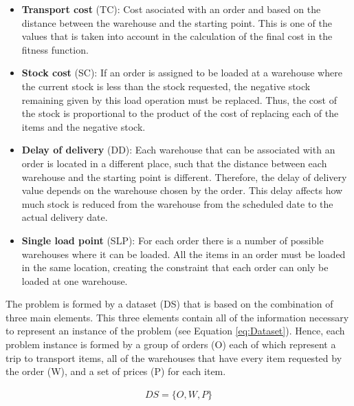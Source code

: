 \documentclass[letterpaper]{article} %
\begin{document}
\begin{itemize}
  \item \textbf{Transport cost }(TC): Cost asociated with an order and based on the distance between the warehouse and the starting point. This is one of the values that is taken into account in the calculation of the final cost in the fitness function.
  \item \textbf{Stock cost }(SC): If an order is assigned to be loaded at a warehouse where the current stock is less than the stock requested, the negative stock remaining given by this load operation must be replaced. Thus, the cost of the stock is proportional to the product of the cost of replacing each of the items and the negative stock.
  \item \textbf{Delay of delivery }(DD): Each warehouse that can be associated with an order is located in a different place, such that the distance between each warehouse and the starting point is different. Therefore, the delay of delivery value depends on the warehouse chosen by the order. This delay affects how much stock is reduced from the warehouse from the scheduled date to the actual delivery date.
  \item \textbf{Single load point }(SLP): For each order there is a number of possible warehouses where it can be loaded. All the items in an order must be loaded in the same location, creating the constraint that each order can only be loaded at one warehouse.
\end{itemize}

The problem is formed by a dataset (DS) that is based on the combination of three main elements. This three elements contain all of the information necessary to represent an instance of the problem (see Equation \ref{eq:Dataset}). Hence, each problem instance is formed by a group of orders (O) each of which represent a trip to transport items, all of the warehouses that have every item requested by the order (W), and a set of prices (P) for each item. 

\begin{equation}\label{eq:Dataset}
    \begin{aligned}
        DS = \{O, W, P\} \\
    \end{aligned}
\end{equation}
  
\end{document}
